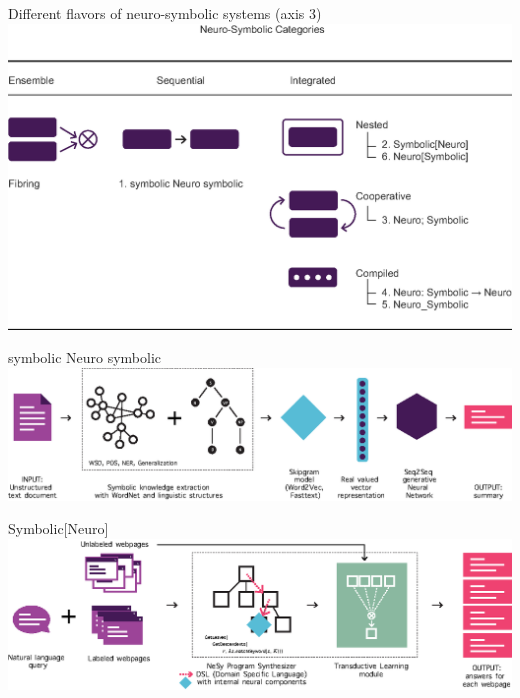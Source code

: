 \documentclass{lecture}
\begin{document}
\begin{frame}{Different flavors of neuro-symbolic systems (axis 3)}
    \centering\includegraphics[width=.8\textwidth,clip,trim=3.5cm 0 0 0]{SW223228/Nesy-topology.eps}
\end{frame}

\begin{frame}{symbolic Neuro symbolic}
    \centering\includegraphics[width=\textwidth]{SW223228/Kouris_et_al.eps}
\end{frame}

\begin{frame}{Symbolic[Neuro]}
    \centering\includegraphics[width=\textwidth]{SW223228/chen_et_al.eps}
\end{frame}
\end{document}
